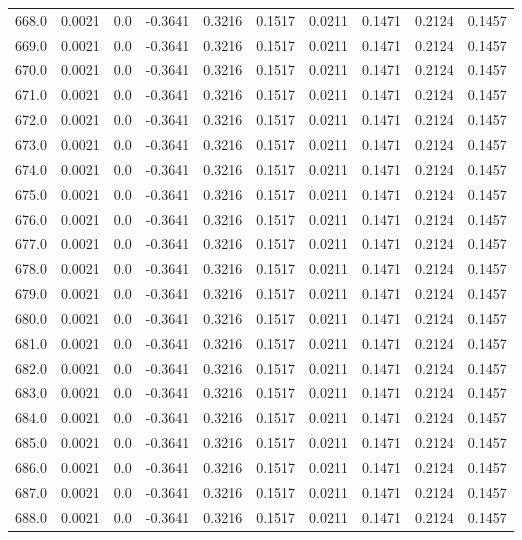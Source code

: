 \begin{longtable}{lrrrrrrrrr}
668.0 & 0.0021 & 0.0 & -0.3641 & 0.3216 & 0.1517 & 0.0211 & 0.1471 & 0.2124 & 0.1457 \\
669.0 & 0.0021 & 0.0 & -0.3641 & 0.3216 & 0.1517 & 0.0211 & 0.1471 & 0.2124 & 0.1457 \\
670.0 & 0.0021 & 0.0 & -0.3641 & 0.3216 & 0.1517 & 0.0211 & 0.1471 & 0.2124 & 0.1457 \\
671.0 & 0.0021 & 0.0 & -0.3641 & 0.3216 & 0.1517 & 0.0211 & 0.1471 & 0.2124 & 0.1457 \\
672.0 & 0.0021 & 0.0 & -0.3641 & 0.3216 & 0.1517 & 0.0211 & 0.1471 & 0.2124 & 0.1457 \\
673.0 & 0.0021 & 0.0 & -0.3641 & 0.3216 & 0.1517 & 0.0211 & 0.1471 & 0.2124 & 0.1457 \\
674.0 & 0.0021 & 0.0 & -0.3641 & 0.3216 & 0.1517 & 0.0211 & 0.1471 & 0.2124 & 0.1457 \\
675.0 & 0.0021 & 0.0 & -0.3641 & 0.3216 & 0.1517 & 0.0211 & 0.1471 & 0.2124 & 0.1457 \\
676.0 & 0.0021 & 0.0 & -0.3641 & 0.3216 & 0.1517 & 0.0211 & 0.1471 & 0.2124 & 0.1457 \\
677.0 & 0.0021 & 0.0 & -0.3641 & 0.3216 & 0.1517 & 0.0211 & 0.1471 & 0.2124 & 0.1457 \\
678.0 & 0.0021 & 0.0 & -0.3641 & 0.3216 & 0.1517 & 0.0211 & 0.1471 & 0.2124 & 0.1457 \\
679.0 & 0.0021 & 0.0 & -0.3641 & 0.3216 & 0.1517 & 0.0211 & 0.1471 & 0.2124 & 0.1457 \\
680.0 & 0.0021 & 0.0 & -0.3641 & 0.3216 & 0.1517 & 0.0211 & 0.1471 & 0.2124 & 0.1457 \\
681.0 & 0.0021 & 0.0 & -0.3641 & 0.3216 & 0.1517 & 0.0211 & 0.1471 & 0.2124 & 0.1457 \\
682.0 & 0.0021 & 0.0 & -0.3641 & 0.3216 & 0.1517 & 0.0211 & 0.1471 & 0.2124 & 0.1457 \\
683.0 & 0.0021 & 0.0 & -0.3641 & 0.3216 & 0.1517 & 0.0211 & 0.1471 & 0.2124 & 0.1457 \\
684.0 & 0.0021 & 0.0 & -0.3641 & 0.3216 & 0.1517 & 0.0211 & 0.1471 & 0.2124 & 0.1457 \\
685.0 & 0.0021 & 0.0 & -0.3641 & 0.3216 & 0.1517 & 0.0211 & 0.1471 & 0.2124 & 0.1457 \\
686.0 & 0.0021 & 0.0 & -0.3641 & 0.3216 & 0.1517 & 0.0211 & 0.1471 & 0.2124 & 0.1457 \\
687.0 & 0.0021 & 0.0 & -0.3641 & 0.3216 & 0.1517 & 0.0211 & 0.1471 & 0.2124 & 0.1457 \\
688.0 & 0.0021 & 0.0 & -0.3641 & 0.3216 & 0.1517 & 0.0211 & 0.1471 & 0.2124 & 0.1457 \\

\end{longtable}
